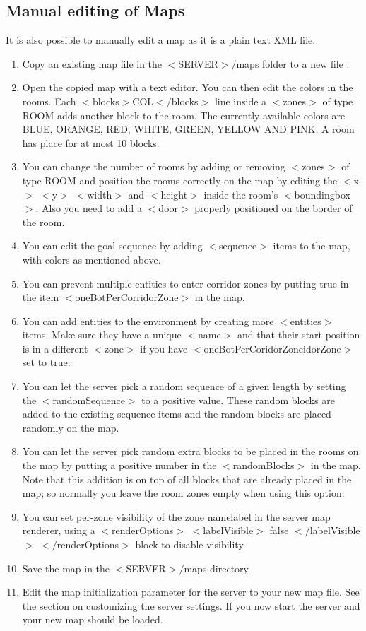 \subsection{Manual editing of Maps}
It is also possible to manually edit a map as it is a plain text XML file.
\begin{enumerate}
\item Copy an existing map file in the $<$SERVER$>/$maps folder to a new file \footnotemark[1].
\item Open the copied map with a text editor. You can then edit the colors in the rooms. Each $<$blocks$>$COL$</$blocks$>$ line inside a $<$zones$>$ of type ROOM adds another block to the room. The currently available colors are BLUE, ORANGE, RED, WHITE, GREEN, YELLOW AND PINK. A room has place for at most 10 blocks.
\item You can change the number of rooms by adding or removing $<$zones$>$ of type ROOM and position the rooms correctly on the map by editing the $<$x$>$ $<$y$>$ $<$width$>$ and $<$height$>$ inside the room's $<$boundingbox$>$. Also you need to add a $<$door$>$ properly positioned on the border of the room.
\item You can edit the goal sequence by adding $<$sequence$>$ items to the map, with colors as mentioned above.
\item You can prevent multiple entities to enter corridor zones by putting true in the item $<$oneBotPerCorridorZone$>$ in the map.
\item You can add entities to the environment by creating more $<$entities$>$ items. Make sure they have a unique $<$name$>$ and that their start position is in a different $<$zone$>$ if you have $<$oneBotPerCoridorZoneidorZone$>$ set to true.
\item You can let the server pick a random sequence of a given length by setting the $<$randomSequence$>$ to a positive value. These random blocks are added to the existing sequence items and the random blocks are placed randomly on the map.
\item You can let the server pick random extra blocks to be placed in the rooms on the map by putting a positive number in the $<$randomBlocks$>$ in the map. Note that this addition is on top of all blocks that are already placed in the map; so normally you leave the room zones empty when using this option.
\item You can set per-zone visibility of the zone namelabel in the server map renderer, using a $<$renderOptions$>$ $<$labelVisible$>$ false $</$labelVisible$>$ $</$renderOptions$>$ block to disable visibility.
\item Save the map in the $<$SERVER$>/$maps directory.
\item Edit the map initialization parameter for the server to your new map file. See the section on customizing the server settings. If you now start the server and your new map should be loaded.
\end{enumerate}


